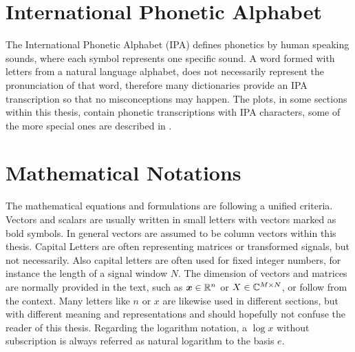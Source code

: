 
\section{International Phonetic Alphabet}\label{sec:intro_overview_ipa}
The International Phonetic Alphabet (IPA) defines phonetics by human speaking sounds, where each symbol represents one specific sound.
A word formed with letters from a natural language alphabet, does not necessarily represent the pronunciation of that word, therefore many dictionaries provide an IPA transcription so that no misconceptions may happen.
The plots, in some sections within this thesis, contain phonetic transcriptions with IPA characters, some of the more special ones are described in .




\section{Mathematical Notations}\label{sec:intro_overview_math}
The mathematical equations and formulations are following a unified criteria.
Vectors and scalars are usually written in small letters with vectors marked as bold symbols.
In general vectors are assumed to be column vectors within this thesis.
Capital Letters are often representing matrices or transformed signals, but not necessarily.
Also capital letters are often used for fixed integer numbers, for instance the length of a signal window $N$.
The dimension of vectors and matrices are normally provided in the text, such as $\bm{x} \in \mathbb{R}^n$ or $X \in \mathbb{C}^{M \times N}$, or follow from the context.
Many letters like $n$ or $x$ are likewise used in different sections, but with different meaning and representations and should hopefully not confuse the reader of this thesis.
Regarding the logarithm notation, a $\log x$ without subscription is always referred as natural logarithm to the basis $e$.